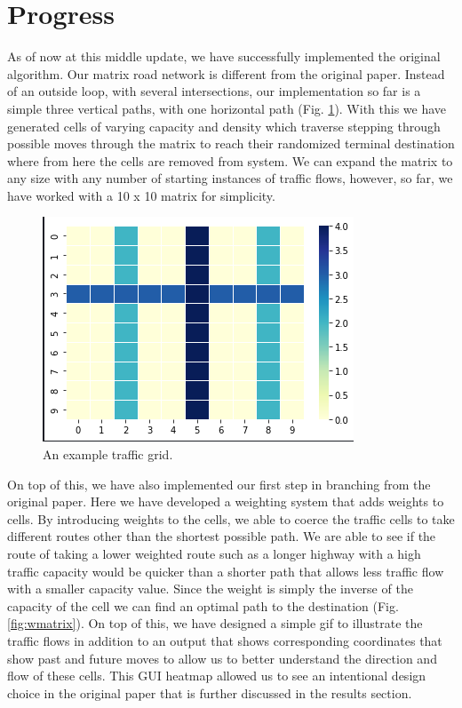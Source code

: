 \documentclass[sigplan,screen]{acmart}
\begin{document}
\section{Progress}
As of now at this middle update, we have successfully implemented the original
algorithm. Our matrix road network is different from the original paper. Instead
of an outside loop, with several intersections, our implementation so far is a
simple three vertical paths, with one horizontal path (Fig. \ref{fig:cmatrix}).
With this we have generated cells of varying capacity and density which traverse
stepping through possible moves through the matrix to reach their randomized
terminal destination where from here the cells are removed from system. We can
expand the matrix to any size with any number of starting instances of traffic
flows, however, so far, we have worked with a 10 x 10 matrix for simplicity. 

\begin{figure}[h]
    \centering
    \includegraphics[width=\columnwidth]{assets/cmatrix.png}
    \caption{An example traffic grid.}
    \label{fig:cmatrix}
\end{figure}

On top of this, we have also implemented our first step in branching from the
original paper. Here we have developed a weighting system that adds weights to
cells. By introducing weights to the cells, we able to coerce the traffic cells
to take different routes other than the shortest possible path. We are able to
see if the route of taking a lower weighted route such as a longer highway with
a high traffic capacity would be quicker than a shorter path that allows less
traffic flow with a smaller capacity value. Since the weight is simply the
inverse of the capacity of the cell we can find an optimal path to the
destination (Fig. \ref{fig:wmatrix}). On top of this, we have designed a simple
gif to illustrate the traffic flows in addition to an output that shows
corresponding coordinates that show past and future moves to allow us to better
understand the direction and flow of these cells. This GUI heatmap allowed us to
see an intentional design choice in the original paper that is further discussed
in the results section.  
\end{document}
